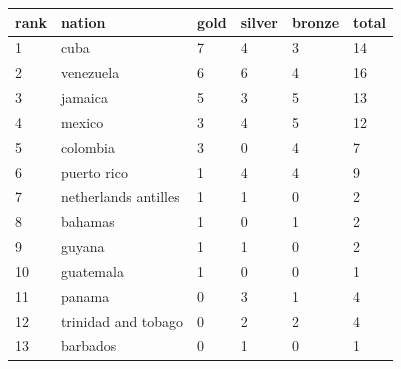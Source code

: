 \documentclass{article}
\begin{document}
\begin{tabular}{llllll}
\toprule
rank & nation & gold & silver & bronze & total \\
\midrule
1 & cuba & 7 & 4 & 3 & 14 \\
2 & venezuela & 6 & 6 & 4 & 16 \\
3 & jamaica & 5 & 3 & 5 & 13 \\
4 & mexico & 3 & 4 & 5 & 12 \\
5 & colombia & 3 & 0 & 4 & 7 \\
6 & puerto rico & 1 & 4 & 4 & 9 \\
7 & netherlands antilles & 1 & 1 & 0 & 2 \\
8 & bahamas & 1 & 0 & 1 & 2 \\
9 & guyana & 1 & 1 & 0 & 2 \\
10 & guatemala & 1 & 0 & 0 & 1 \\
11 & panama & 0 & 3 & 1 & 4 \\
12 & trinidad and tobago & 0 & 2 & 2 & 4 \\
13 & barbados & 0 & 1 & 0 & 1 \\
\bottomrule
\end{tabular}
\end{document}
